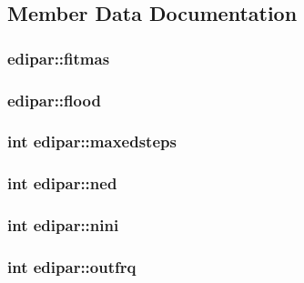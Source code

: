 \subsection{\-Member \-Data \-Documentation}
\hypertarget{structedipar_a22d1ddf605f349a1e1903fc95ec531ca}{
\subsubsection[{fitmas}]{ {\bf edipar\-::fitmas}}}\label{structedipar_a22d1ddf605f349a1e1903fc95ec531ca}
\hypertarget{structedipar_ad01fd4d0a2936de48b0c09e27eeb8748}{
\subsubsection[{flood}]{ {\bf edipar\-::flood}}}\label{structedipar_ad01fd4d0a2936de48b0c09e27eeb8748}
\hypertarget{structedipar_a2c2c8059df648128f8220b1cc2bdea36}{
\subsubsection[{maxedsteps}]{\setlength{\rightskip}{0pt plus 5cm}int {\bf edipar\-::maxedsteps}}}\label{structedipar_a2c2c8059df648128f8220b1cc2bdea36}
\hypertarget{structedipar_a95a4d9d6fea6b242f7fded02995d0376}{
\subsubsection[{ned}]{\setlength{\rightskip}{0pt plus 5cm}int {\bf edipar\-::ned}}}\label{structedipar_a95a4d9d6fea6b242f7fded02995d0376}
\hypertarget{structedipar_a954b2e4407771bf07444eb57274a11d5}{
\subsubsection[{nini}]{\setlength{\rightskip}{0pt plus 5cm}int {\bf edipar\-::nini}}}\label{structedipar_a954b2e4407771bf07444eb57274a11d5}
\hypertarget{structedipar_ae232fb973de018543bacb697be0e3e0c}{
\subsubsection[{outfrq}]{\setlength{\rightskip}{0pt plus 5cm}int {\bf edipar\-::outfrq}}}\label{structedipar_ae232fb973de018543bacb697be0e3e0c}
